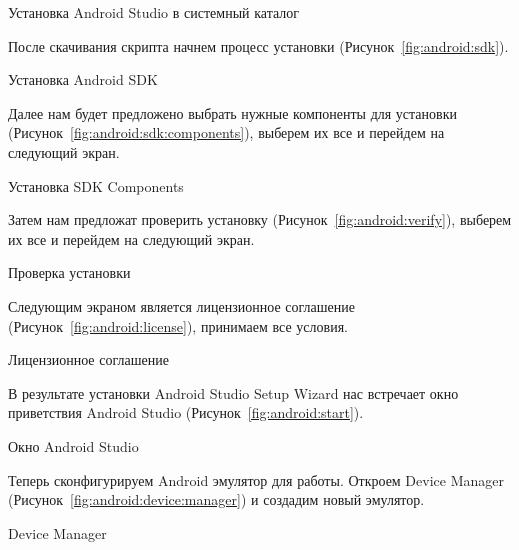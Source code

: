\begin{image}
	\caption{Установка Android Studio в системный каталог}
	\label{fig:android:opt}
\end{image}


После скачивания скрипта начнем процесс установки
(Рисунок~\ref{fig:android:sdk}).

\begin{image}
	\caption{Установка Android SDK}
	\label{fig:android:sdk}
\end{image}

Далее нам будет предложено выбрать нужные компоненты для установки
(Рисунок~\ref{fig:android:sdk:components}),
выберем их все и перейдем на следующий экран.

\begin{image}
	\caption{Установка SDK Components}
	\label{fig:android:sdk:components}
\end{image}

Затем нам предложат проверить установку (Рисунок~\ref{fig:android:verify}),
выберем их все и перейдем на следующий экран.

\begin{image}
	\caption{Проверка установки}
	\label{fig:android:verify}
\end{image}

Следующим экраном является лицензионное соглашение
(Рисунок~\ref{fig:android:license}), принимаем все условия.

\begin{image}
	\caption{Лицензионное соглашение}
	\label{fig:android:license}
\end{image}

В результате установки Android Studio Setup Wizard
нас встречает окно приветствия Android Studio
(Рисунок~\ref{fig:android:start}).

\begin{image}
	\caption{Окно Android Studio}
	\label{fig:android:start}
\end{image}

Теперь сконфигурируем Android эмулятор для работы.
Откроем Device Manager (Рисунок~\ref{fig:android:device:manager})
и создадим новый эмулятор.

\begin{image}
	\caption{Device Manager}
	\label{fig:android:device:manager}
\end{image}

